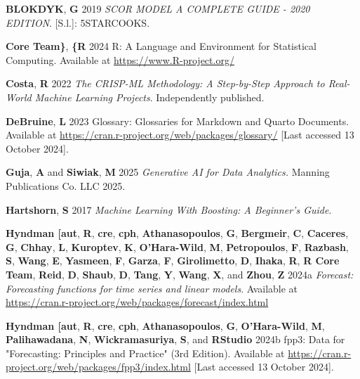 \documentclass[
  american,
  10,
  a4paper,
]{book}
\newlength{\cslhangindent}
\newenvironment{CSLReferences}[2] %
 {\begin{list}{}{%
  \setlength{\itemindent}{0pt}
  \setlength{\leftmargin}{0pt}
  \setlength{\parsep}{0pt}
  \ifodd #1
   \setlength{\leftmargin}{\cslhangindent}
   \setlength{\itemindent}{-1\cslhangindent}
  \fi
  \setlength{\itemsep}{#2\baselineskip}}}
 {\end{list}}
\theoremstyle{definition}
\theoremstyle{remark}
\begin{document}
\begin{CSLReferences}{0}{0}
\textbf{BLOKDYK}, \textbf{G} 2019 \emph{{SCOR} {MODEL} {A} {COMPLETE}
{GUIDE} - 2020 {EDITION}}. {[}S.l.{]}: 5STARCOOKS.

\textbf{Core Team\}}, \textbf{\{R} 2024 R: {A} {Language} and
{Environment} for {Statistical} {Computing}. Available at
\url{https://www.R-project.org/}

\textbf{Costa}, \textbf{R} 2022 \emph{The {CRISP}-{ML} {Methodology}:
{A} {Step}-by-{Step} {Approach} to {Real}-{World} {Machine} {Learning}
{Projects}}. Independently published.

\textbf{DeBruine}, \textbf{L} 2023 Glossary: {Glossaries} for {Markdown}
and {Quarto} {Documents}. Available at
\url{https://cran.r-project.org/web/packages/glossary/} {[}Last accessed
13 October 2024{]}.

\textbf{Guja}, \textbf{A} and \textbf{Siwiak}, \textbf{M} 2025
\emph{Generative {AI} for {Data} {Analytics}.} Manning Publications Co.
LLC 2025.

\textbf{Hartshorn}, \textbf{S} 2017 \emph{Machine {Learning} {With}
{Boosting}: {A} {Beginner}'s {Guide}}.

\textbf{Hyndman {[}aut}, \textbf{R}, \textbf{cre}, \textbf{cph},
\textbf{Athanasopoulos}, \textbf{G}, \textbf{Bergmeir}, \textbf{C},
\textbf{Caceres}, \textbf{G}, \textbf{Chhay}, \textbf{L},
\textbf{Kuroptev}, \textbf{K}, \textbf{O'Hara-Wild}, \textbf{M},
\textbf{Petropoulos}, \textbf{F}, \textbf{Razbash}, \textbf{S},
\textbf{Wang}, \textbf{E}, \textbf{Yasmeen}, \textbf{F}, \textbf{Garza},
\textbf{F}, \textbf{Girolimetto}, \textbf{D}, \textbf{Ihaka},
\textbf{R}, \textbf{R Core Team}, \textbf{Reid}, \textbf{D},
\textbf{Shaub}, \textbf{D}, \textbf{Tang}, \textbf{Y}, \textbf{Wang},
\textbf{X}, and \textbf{Zhou}, \textbf{Z} 2024a \emph{Forecast:
Forecasting functions for time series and linear models}. Available at
\url{https://cran.r-project.org/web/packages/forecast/index.html}

\textbf{Hyndman {[}aut}, \textbf{R}, \textbf{cre}, \textbf{cph},
\textbf{Athanasopoulos}, \textbf{G}, \textbf{O'Hara-Wild}, \textbf{M},
\textbf{Palihawadana}, \textbf{N}, \textbf{Wickramasuriya}, \textbf{S},
and \textbf{RStudio} 2024b fpp3: {Data} for "{Forecasting}: {Principles}
and {Practice}" (3rd {Edition}). Available at
\url{https://cran.r-project.org/web/packages/fpp3/index.html} {[}Last
accessed 13 October 2024{]}.


\end{CSLReferences}
\end{document}
